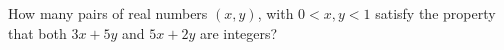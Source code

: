 How many pairs of real numbers $(x, y)$, with $0 < x, y < 1$ satisfy the property that both $3x + 5y$ and $5x + 2y$ are integers?
